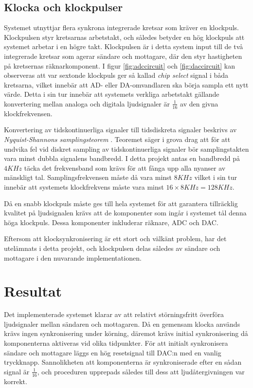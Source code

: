 \documentclass[a4paper,10pt]{article}
\begin{document}
\subsection{Klocka och klockpulser}

Systemet utnyttjar flera synkrona integrerade kretsar som kräver en
klockpuls. Klockpulsen styr kretsarnas arbetstakt, och således betyder en hög 
klockpuls att systemet arbetar i en högre takt. Klockpulsen är i detta system 
input till de två integrerade kretsar som agerar sändare och mottagare, där den 
styr hastigheten på kretsernas räknarkomponent. I figur \ref{fig:adccircuit} och 
\ref{fig:daccircuit} kan observeras att var sextonde klockpuls ger så kallad 
\textit{chip select} signal i båda kretsarna, vilket innebär att AD- eller 
DA-omvandlaren ska börja sampla ett nytt värde. Detta i sin tur innebär att 
systemets verkliga arbetstakt gällande konvertering mellan analoga och digitala 
ljudsignaler är $\frac{1}{16}$ av den givna klockfrekvensen.

Konvertering av tidskontinuerliga signaler till tidsdiskreta signaler beskrivs 
av \textit{Nyquist-Shannons samplingsteorem} \cite{sampling}. Teoremet säger i 
grova drag att för att undvika fel vid diskret sampling av tidskontinuerliga 
signaler bör samplingstakten vara minst dubbla signalens bandbredd. I detta 
projekt antas en bandbredd på $4KHz$ täcka det frekvensband som krävs för att 
fånga upp alla nyanser av mänskligt tal. Samplingsfrekvensen måste då vara 
minst $8KHz$ vilket i sin tur innebär att systemets klockfrekvens måste vara 
minst $16 \times 8KHz = 128KHz$.

Då en snabb klockpuls måste ges till hela systemet för att garantera tillräcklig 
kvalitet på ljudsignalen krävs att de komponenter som ingår i systemet tål denna 
höga klockpuls. Dessa komponenter inkluderar räknare, ADC och DAC.

Eftersom att klocksynkronisering är ett stort och välkänt problem, har det 
utelämnats i detta projekt, och klockpulsen delas således av sändare och 
mottagare i den nuvarande implementationen. 


\section{Resultat}

Det implementerade systemet klarar av att relativt störningsfritt överföra 
ljudsignaler mellan sändaren och mottagaren. Då en gemensam klocka används
krävs ingen synkronisering under körning, däremot krävs initial synkronisering
då komponenterna aktiveras vid olika tidpunkter. För att initialt 
synkronisera sändare och mottagare läggs en hög resetsignal till DAC:n 
med en vanlig tryckknapp. Sannolikheten att komponenterna är synkroniserade
efter en sådan signal är $\frac{1}{16}$, och proceduren upprepads således 
till dess att ljudåtergivningen var korrekt. 
\end{document}
